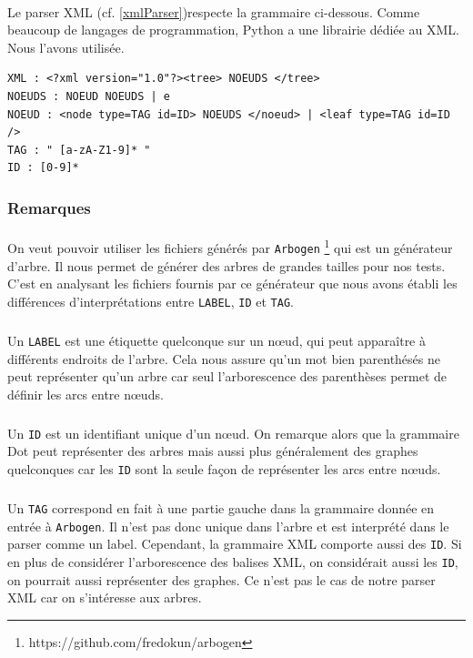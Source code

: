 \paragraph{}Le parser XML (cf. \ref{xmlParser})respecte la grammaire ci-dessous. Comme beaucoup de langages de programmation, Python a une librairie dédiée au XML. Nous l'avons utilisée.
		
\begin{verbatim}
XML : <?xml version="1.0"?><tree> NOEUDS </tree>
NOEUDS : NOEUD NOEUDS | e
NOEUD : <node type=TAG id=ID> NOEUDS </noeud> | <leaf type=TAG id=ID />
TAG : " [a-zA-Z1-9]* "
ID : [0-9]*
\end{verbatim}

		\subsubsection*{Remarques}

\paragraph{} On veut pouvoir utiliser les fichiers générés par \verb|Arbogen| \cite{REF_Arbogen} \footnote{https://github.com/fredokun/arbogen} qui est un générateur d'arbre. Il nous permet de générer des arbres de grandes tailles pour nos tests. C'est en analysant les fichiers fournis par ce générateur que nous avons établi les différences d'interprétations entre \verb|LABEL|, \verb|ID| et \verb|TAG|.

\subparagraph{}Un \verb|LABEL| est une étiquette quelconque sur un n\oe ud, qui peut apparaître à différents endroits de l'arbre. Cela nous assure qu'un mot bien parenthésés ne peut représenter qu'un arbre car seul l'arborescence des parenthèses permet de définir les arcs entre n\oe uds.

\subparagraph{}Un \verb|ID| est un identifiant unique d'un n\oe ud. On remarque alors que la grammaire Dot peut représenter des arbres mais aussi plus généralement des graphes quelconques car les \verb|ID| sont la seule façon de représenter les arcs entre n\oe uds.

\subparagraph{}Un \verb|TAG| correspond en fait à une partie gauche dans la grammaire donnée en entrée à \verb|Arbogen|. Il n'est pas donc unique dans l'arbre et est interprété dans le parser comme un label. Cependant, la grammaire XML comporte aussi des \verb|ID|. Si en plus de considérer l'arborescence des balises XML, on considérait aussi les \verb|ID|, on pourrait aussi représenter des graphes. Ce n'est pas le cas de notre parser XML car on s'intéresse aux arbres.

